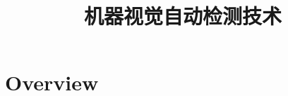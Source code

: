 \documentclass[11pt]{article}
\title{机器视觉自动检测技术}
\begin{document}
\maketitle

\section{Overview}
\end{document}
